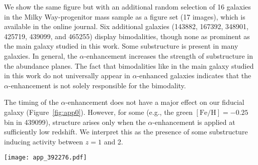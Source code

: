 \documentclass[twocolumn]{aastex631}
\newcommand{\FeH}{\ensuremath{[\textrm{Fe}/\textrm{H}]}}
\begin{document}
We show the same figure but with an additional random selection of 16 galaxies in the Milky Way-progenitor mass sample as a figure set (17 images), which is available in the online journal. Six additional galaxies (143882, 167392, 348901, 425719, 439099, and 465255) display bimodalities, though none as prominent as the main galaxy studied in this work. Some substructure is present in many galaxies. In general, the $\alpha$-enhancement increases the strength of substructure in the abundance planes. The fact that bimodalities like in the main galaxy studied in this work do not universally appear in $\alpha$-enhanced galaxies indicates that the $\alpha$-enhancement is not solely responsible for the bimodality.

The timing of the $\alpha$-enhancement does not have a major effect on our fiducial galaxy (Figure~\ref{fig:app0}). However, for some (e.g., the green $\FeH=-0.25$ bin in 439099), structure arises only when the $\alpha$-enhancement is applied at sufficiently low redshift. We interpret this as the presence of some substructure inducing activity between $z=1$ and 2.

\begin{figure*}
  \centering
  \texttt{[image: app\_392276.pdf]}
  \caption{Abundance plane of the fiducial galaxy at $z=0$ and the effects of $\alpha$-enhancement applied at different redshifts. The leftmost panel shows the fiducial galaxy without enhancement, reproducing the middle column of Figure~\ref{fig:fig1}. The subsequent panels from left to right show the results of applying $\alpha$-enhancement at redshifts of 1, 1.5, and 2, respectively. The $z=1.5$ column reproduces the right column of Figure~\ref{fig:fig1}. The presence of substructure in the abundance plane is consistent across different application times of $\alpha$-enhancement, though applying it at lower redshifts appears to slightly increase the separation between modal peaks. This figure is part of a set of 17 images available in the online journal, showing similar plots for 16 additional galaxies from our Milky Way-progenitor mass sample. The varied responses to $\alpha$-enhancement across the sample, with only six additional galaxies (143882, 167392, 348901, 425719, 439099, and 465255) displaying bimodalities, suggest that while $\alpha$-enhancement generally increases substructure, it is not solely responsible for creating bimodalities in abundance planes.}
  \label{fig:app0}
\end{figure*}
\end{document}
